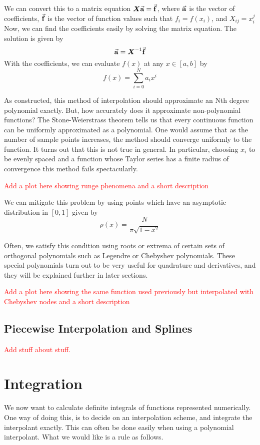 \documentclass[12pt,letterpaper]{article}
\numberwithin{equation}{section}
\newcommand{\beq}{\begin{equation}}
\newcommand{\eeq}{\end{equation}}
\begin{document}
\indent We can convert this to a matrix equation $\boldsymbol{X}\va{a} = \va{f}$, where $\va{a}$ is the vector of coefficients, $\va{f}$ is the vector of function values such that $f_i = f(x_i)$, and $X_{ij} = x_i^j$ Now, we can find the coefficients easily by solving the matrix equation. The solution is given by 
\beq
\va{a} = \boldsymbol{X}^{-1} \va{f}
\eeq
With the coefficients, we can evaluate $f(x)$ at any $x \in [a,b]$ by
\beq
f(x) = \sum_{i=0}^{N} a_i x^i
\eeq

\indent As constructed, this method of interpolation should approximate an Nth degree polynomial exactly. But, how accurately does it approximate non-polynomial functions? The Stone-Weierstrass theorem tells us that every continuous function can be uniformly approximated as a polynomial. One would assume that as the number of sample points increases, the method should converge uniformly to the function. It turns out that this is not true in general. In particular, choosing $x_i$ to be evenly spaced and a function whose Taylor series has a finite radius of convergence this method fails spectacularly.
\begin{center}
\textcolor{red}{Add a plot here showing runge phenomena and a short description}
\end{center}

\indent We can mitigate this problem by using points which have an asymptotic distribution in $[0,1]$ given by
\beq
\rho(x) = \frac{N}{\pi \sqrt{1 - x^2}}
\eeq

\indent Often, we satisfy this condition using roots or extrema of certain sets of orthogonal polynomials such as Legendre or Chebyshev polynomials. These special polynomials turn out to be very useful for quadrature and derivatives, and they will be explained further in later sections.

\begin{center}
\textcolor{red}{Add a plot here showing the same function used previously but interpolated with Chebyshev nodes and a short description}
\end{center}

\subsection{Piecewise Interpolation and Splines}
\begin{center}
\textcolor{red}{Add stuff about stuff.}
\end{center}

\section{Integration}
We now want to calculate definite integrals of functions represented numerically. One way of doing this, is to decide on an interpolation scheme, and integrate the interpolant exactly. This can often be done easily when using a polynomial interpolant. What we would like is a rule as follows.
\end{document}
